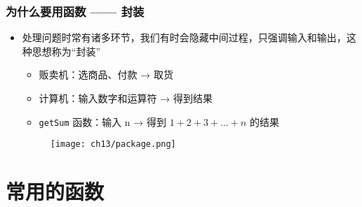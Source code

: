\begin{frame}[fragile]
    \frametitle{为什么要用函数 —— 封装}

    \begin{itemize}
        \item 处理问题时常有诸多环节，我们有时会隐藏中间过程，只强调输入和输出，这种思想称为“封装”
        \begin{itemize}
            \item 贩卖机：选商品、付款 → 取货
            \item 计算机：输入数字和运算符 → 得到结果
            \item \lstinline|getSum| 函数：输入 n → 得到 $1+2+3+\dots+n$ 的结果
        \end{itemize}

        \begin{figure}
            \texttt{[image: ch13/package.png]}
        \end{figure}
    \end{itemize}
\end{frame}

\section{常用的函数}


